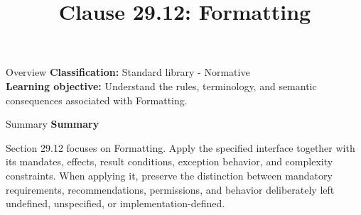 \documentclass[10pt,letterpaper]{article}
\title{Clause 29.12: Formatting}
\author{}
\date{}
\begin{document}
\maketitle
\begin{CornellOverviewBox}{Overview}
\textbf{Classification:} Standard library - Normative\\[2pt]
\textbf{Learning objective:} Understand the rules, terminology, and semantic consequences associated with Formatting.
\end{CornellOverviewBox}\begin{CornellSummaryBox}{Summary}
{\sffamily\bfseries\color{Accent} Summary}\par\vspace{3pt}Section 29.12 focuses on Formatting. Apply the specified interface together with its mandates, effects, result conditions, exception behavior, and complexity constraints. When applying it, preserve the distinction between mandatory requirements, recommendations, permissions, and behavior deliberately left undefined, unspecified, or implementation-defined.
\end{CornellSummaryBox}
\end{document}
